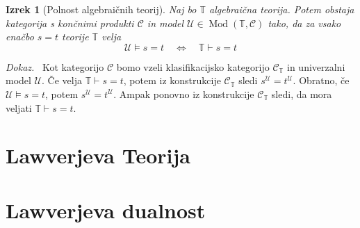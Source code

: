 \documentclass[12pt,a4paper]{book}
\theoremstyle{definition}
\theoremstyle{plain}
\newtheorem{izrek}[definicija]{Izrek}
\newenvironment{dokaz}{\emph{Dokaz.}\ }{\hspace{\fill}{$\Box$}}
\theoremstyle{definition}
\theoremstyle{remark}
\DeclareMathOperator{\Mod}{Mod}
\begin{document}
\begin{izrek}[Polnost algebraičnih teorij]
Naj bo $\mathbb{T}$ algebraična teorija. Potem obstaja kategorija s končnimi produkti $\mathcal{C}$ in model $\mathcal{U} \in \Mod(\mathbb{T}, \mathcal{C})$ tako, da za vsako enačbo $s = t$ teorije $\mathbb{T}$ velja
$$\mathcal{U} \models s = t \quad \Longleftrightarrow \quad \mathbb{T} \vdash s = t$$
\end{izrek}
\begin{dokaz}
Kot kategorijo $\mathcal{C}$ bomo vzeli klasifikacijsko kategorijo $\mathcal{C}_\mathbb{T}$ in univerzalni model $\mathcal{U}$. Če velja $\mathbb{T} \vdash s = t$, potem iz konstrukcije $\mathcal{C}_\mathbb{T}$ sledi $s^\mathcal{U} = t^\mathcal{U}$. Obratno, če $\mathcal{U} \models s = t$, potem $s^\mathcal{U} = t^\mathcal{U}$. Ampak ponovno iz konstrukcije $\mathcal{C}_\mathbb{T}$ sledi, da mora veljati $\mathbb{T} \vdash s = t$.
\end{dokaz}
%
%
\section{Lawverjeva Teorija}
%
\section{Lawverjeva dualnost}
%
\end{document}
